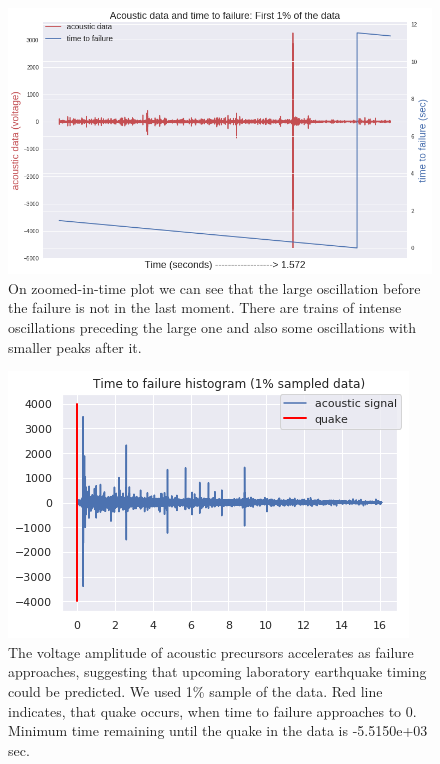 \documentclass[]{llncs} %
\begin{document}
\begin{figure}[h!]
	\centering
	\includegraphics[width=01\linewidth]{zoomedInTimePLot}
	\caption{On zoomed-in-time plot we can see that the large oscillation before the failure is not in the last moment. There are trains of intense oscillations preceding the large one and also some oscillations with smaller peaks after it.}
	\label{fig:zoomeInTimePlot}
\end{figure}

\begin{figure}[h!]
	\centering
	\includegraphics[width=01\linewidth]{timeToFailureHistogram}
	\caption{The voltage amplitude of acoustic precursors accelerates as failure approaches, suggesting that upcoming laboratory earthquake timing could be predicted. We used 1\% sample of the data. Red line indicates, that quake occurs, when time to failure approaches to 0. Minimum time remaining until the quake in the data is  -5.5150e+03 sec.}
	\label{fig:timeToFailureHistogram}
\end{figure}
\end{document}
